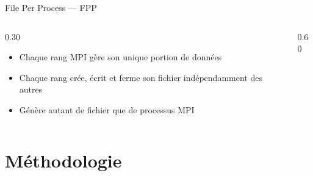 \documentclass[svgnames,9pt,aspectratio=169]{beamer}
\begin{document}
\begin{frame}{File Per Process --- FPP}
  \begin{columns}[t]
    \begin{column}{0.30\textwidth}
      \begin{itemize}
        \item Chaque rang MPI gère son unique portion de données
        \item Chaque rang crée, écrit et ferme son fichier indépendamment des autres
        \item Génère autant de fichier que de processus MPI
      \end{itemize}
    \end{column}

    \begin{column}{0.60\textwidth}
      \begin{center}
        
      \end{center}
    \end{column}
  \end{columns}
\end{frame}

\section{Méthodologie}
\frame{\sectionpage}
\end{document}
